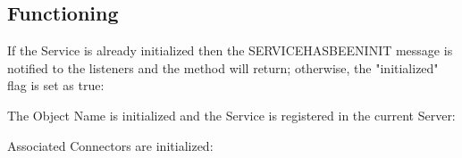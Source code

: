 \documentclass[../../codeInspection.tex]{subfiles}
\begin{document}
		\subsection{Functioning}

			If the Service is already initialized then the SERVICE\textunderscore HAS\textunderscore BEEN\textunderscore INIT message is notified to the listeners and the method will return; otherwise, the "initialized" flag is set as true:
			

			The Object Name is initialized and the Service is registered in the current Server:
			

			Associated Connectors are initialized:
			
\end{document}

